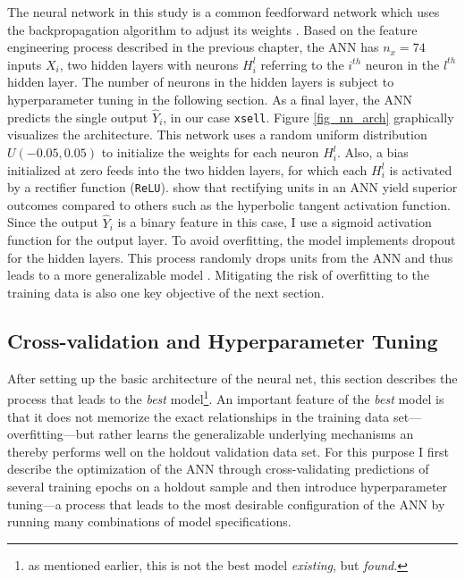 \documentclass[12pt,a4paper]{article}
\let\code=\texttt
\begin{document}
The neural network in this study is a common feedforward network which uses the backpropagation algorithm to adjust its weights \citep{werbosBackpropagationTimeWhat1990}.
Based on the feature engineering process described in the previous chapter, the ANN has $n_x = 74$ inputs $X_i$, 
two hidden layers with neurons $H_i^l$ referring to the $i^{th}$ neuron in the $l^{th}$ hidden layer. 
The number of neurons in the hidden layers is subject to hyperparameter tuning in the following section.
As a final layer, the ANN predicts the single output $\hat{Y}_i$, in our case \code{xsell}.
Figure \ref{fig_nn_arch} graphically visualizes the architecture.
 \label{fig_nn_arch}
This network uses a random uniform distribution $U(-0.05, 0.05)$ to initialize the weights for each neuron $H_i^l$.
Also, a bias initialized at zero feeds into the two hidden layers, for which each $H_i^l$ is activated by a rectifier function (\code{ReLU}).
\cite{glorotDeepSparseRectifier2011} show that rectifying units in an ANN yield superior outcomes compared to others such as the hyperbolic tangent activation function. Since the output $\hat{Y}_i$ is a binary feature in this case, I use a sigmoid activation function for the output layer.
To avoid overfitting, the model implements dropout for the hidden layers.
This process randomly drops units from the ANN and thus leads to a more generalizable model \citep{srivastavaDropoutSimpleWay2014}.
Mitigating the risk of overfitting to the training data is also one key objective of the next section.

\subsection{Cross-validation and Hyperparameter Tuning} \label{sec_crossval}
After setting up the basic architecture of the neural net, this section describes the process that leads to the \textit{best} model\footnote{as mentioned earlier, this is not the best model \textit{existing}, but \textit{found}.}.
An important feature of the \textit{best} model is that it does not memorize the exact relationships in the training data set---overfitting---but
rather learns the generalizable underlying mechanisms an thereby performs well on the holdout validation data set. 
For this purpose I first describe the optimization of the ANN through cross-validating predictions of several training epochs on a holdout 
sample and then introduce hyperparameter tuning---a process that leads to the most desirable configuration of the ANN by
running many combinations of model specifications.
\end{document}
